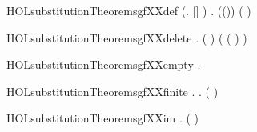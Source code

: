 \newcommand{\HOLsubstitutionTheoremsgfXXappend}{\UseVerbatim{HOLsubstitutionTheoremsgfXXappend}}
\begin{SaveVerbatim}{HOLsubstitutionTheoremsgfXXdef}
\HOLTokenTurnstile{} (\HOLSymConst{\HOLTokenForall{}}.  []  \HOLSymConst{=} ) \HOLSymConst{\HOLTokenConj{}}
   \HOLSymConst{\HOLTokenForall{}}   .  ((\HOLSymConst{,})\HOLSymConst{::})  \HOLSymConst{=}    (  )
\end{SaveVerbatim}
\newcommand{\HOLsubstitutionTheoremsgfXXdef}{\UseVerbatim{HOLsubstitutionTheoremsgfXXdef}}
\begin{SaveVerbatim}{HOLsubstitutionTheoremsgfXXdelete}
\HOLTokenTurnstile{} \HOLSymConst{\HOLTokenForall{}}  .
       (  ) \HOLSymConst{\HOLTokenImp{}}
     (  (  ) \HOLSymConst{=}       )
\end{SaveVerbatim}
\newcommand{\HOLsubstitutionTheoremsgfXXdelete}{\UseVerbatim{HOLsubstitutionTheoremsgfXXdelete}}
\begin{SaveVerbatim}{HOLsubstitutionTheoremsgfXXempty}
\HOLTokenTurnstile{} \HOLSymConst{\HOLTokenForall{}}.   \HOLTokenLeftbrace{}\HOLTokenRightbrace{} \HOLSymConst{=} \HOLTokenLeftbrace{}\HOLTokenRightbrace{}
\end{SaveVerbatim}
\newcommand{\HOLsubstitutionTheoremsgfXXempty}{\UseVerbatim{HOLsubstitutionTheoremsgfXXempty}}
\begin{SaveVerbatim}{HOLsubstitutionTheoremsgfXXfinite}
\HOLTokenTurnstile{} \HOLSymConst{\HOLTokenForall{}}.   \HOLSymConst{\HOLTokenImp{}} \HOLSymConst{\HOLTokenForall{}}.  (  )
\end{SaveVerbatim}
\newcommand{\HOLsubstitutionTheoremsgfXXfinite}{\UseVerbatim{HOLsubstitutionTheoremsgfXXfinite}}
\begin{SaveVerbatim}{HOLsubstitutionTheoremsgfXXim}
\HOLTokenTurnstile{} \HOLSymConst{\HOLTokenForall{}}.   \HOLSymConst{=}  ( )
\end{SaveVerbatim}
